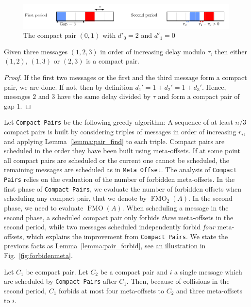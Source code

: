 \documentclass[a4paper,UKenglish,cleveref, autoref, thm-restate]{lipics-v2019}
\DeclareMathOperator{\Fmo}{FMO}
\newcommand\compactpair{\texttt{Compact Pairs}\xspace}
\newcommand\metaoffset{\texttt{Meta Offset}\xspace}
\begin{document}
\begin{figure}[h]
\begin{center}

\includegraphics[scale=0.7]{compact_pair}
\end{center}
\caption{The compact pair $(0,1)$ with $d'_0 = 2$ and $d'_1 = 0$}
\label{fig:compactpair}
\end{figure}

\begin{lemma}\label{lemma:pair_find}
Given three messages $(1,2,3)$ in order of increasing delay modulo $\tau$, then either $(1,2)$, $(1,3)$ or $(2,3)$ is a compact pair. 
\end{lemma}
\begin{proof}
If the first two messages or the first and the third message form a compact pair, we are done. If not, then by definition $d_{1}' = 1 + d_{2}' = 1 + d_{3}'$. Hence, messages $2$ and $3$ have the same delay divided by $\tau$ and form a compact pair of gap $1$.
\end{proof}

Let \compactpair be the following greedy algorithm:  A sequence of at least $n/3$ compact pairs is built by considering triples of messages in order of increasing $r_i$, and applying Lemma~\ref{lemma:pair_find} to each triple. Compact pairs are scheduled in the order they have been built using meta-offsets. If at some point all compact pairs are scheduled or the current one cannot be scheduled, the remaining messages are scheduled as in \metaoffset. The analysis of \compactpair relies on the evaluation of the number of forbidden meta-offsets. In the first phase of \compactpair, we evaluate the number of forbidden offsets when scheduling any compact pair, that we denote by $\Fmo_2(A)$. In the second phase, we need to evaluate $\Fmo(A)$. When scheduling a message in the second phase, a scheduled compact pair only forbids \emph{three} meta-offsets in the second period, while two messages scheduled independently forbid \emph{four} meta-offsets, which explains the improvement from \compactpair. We state the previous facts as Lemma~\ref{lemma:pair_forbid}, see an illustration in Fig.~\ref{fig:forbidenmeta}. 

\begin{lemma}\label{lemma:pair_forbid}
Let $C_1$ be compact pair. Let $C_2$  be a compact pair and $i$ a single message which are scheduled by \compactpair after $C_1$.
Then, because of collisions in the second period, $C_1$ forbids at most four meta-offsets to $C_2$ and three meta-offsets to $i$. 
\end{lemma}
\end{document}
